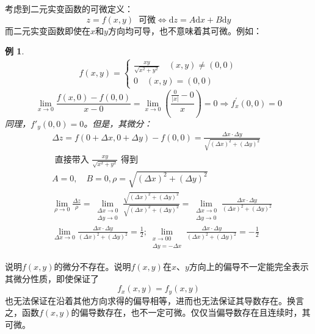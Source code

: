 \documentclass[12pt, a4paper, oneside]{ctexart}
\newtheorem{example}[theorem]{例}
\def\D{\mathrm{d}}
\begin{document}
考虑到二元实变函数的可微定义：
$$
z=f(x,y)\;\; \text{可微} \Leftrightarrow \D z = A \D x + B \D y
$$
而二元实变函数即使在$x$和$y$方向均可导，也不意味着其可微。例如：
\begin{example}
\begin{align*}
f(x, y)=\begin{cases}\displaystyle
\frac{x y}{ \sqrt{x^{2}+y^{2}}}\quad  (x, y) \neq(0,0) \\
0 \quad (x, y)=(0,0)
\end{cases} 
\end{align*}
\begin{equation*}
    \lim _{x \rightarrow 0} \frac{f(x, 0)-f(0,0)}{x-0}=\lim _{x \rightarrow 0}\left(\frac{\displaystyle \frac{0}{|x|}-0}{x}\right)=0 \Rightarrow f_{x}^{\prime}(0,0)=0
\end{equation*}
同理，$f'_y(0,0)=0$。但是，其微分：
\begin{equation*}
    \begin{aligned}
    &\Delta z=f(0+\Delta x, 0+\Delta y)-f(0,0)=\frac{\Delta x \cdot \Delta y}{\sqrt{(\Delta x)^{2}+(\Delta y)^{2}}} \\
    &\text { 直接带入 } \frac{x y}{\sqrt{x^{2}+y^{2}}} \text { 得到 } \\
    &A=0, \quad B=0, \rho=\sqrt{(\Delta x)^{2}+(\Delta y)^{2}} \\
    &\lim _{\rho \rightarrow 0} \frac{\Delta z}{\rho}=\lim _{\substack{\Delta x \rightarrow 0 \\
    \Delta y \rightarrow 0}} \frac{\sqrt{(\Delta x)^{2}+(\Delta y)^{2}}}{\sqrt{(\Delta x)^{2}+(\Delta y)^{2}}}=\lim _{\substack{\Delta x \rightarrow 0 \\
    \Delta y \rightarrow 0}} \frac{\Delta x \cdot \Delta y}{(\Delta x)^{2}+(\Delta y)^{2}} \\
    & \lim _{\Delta x \rightarrow 0} \frac{\Delta x \cdot \Delta y}{(\Delta x)^{2}+(\Delta y)^{2}}=\frac{1}{2} ; \lim _{\substack{x \rightarrow 00 \\
    \Delta y=-\Delta x}} \frac{\Delta x \cdot \Delta y}{(\Delta x)^{2}+(\Delta y)^{2}}=-\frac{1}{2}
    \end{aligned}
\end{equation*}
\end{example}
说明$f(x,y)$的微分不存在。说明$f(x,y)$在$x$、$y$方向上的偏导不一定能完全表示其微分性质，即使保证了
$$
f_x(x,y)=f_y(x,y)
$$
也无法保证在沿着其他方向求得的偏导相等，进而也无法保证其导数存在。换言之，函数$f(x,y)$的偏导数存在，也不一定可微。仅仅当偏导数存在且连续时，其可微。
\end{document}
